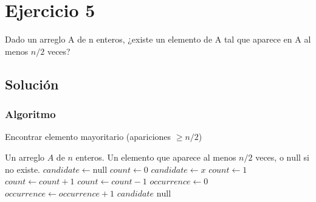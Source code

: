 \section{Ejercicio 5}
Dado un arreglo A de n enteros, ¿existe un elemento de A tal que aparece en A al menos $n/2$ veces?

\subsection*{Solución}
\subsubsection*{Algoritmo}
\begin{algorithm}[H]
\caption{Encontrar elemento mayoritario (apariciones $\geq n/2$)}
\begin{algorithmic}[1]
\REQUIRE Un arreglo \( A \) de \( n \) enteros.
\ENSURE Un elemento que aparece al menos \( n/2 \) veces, o \(\text{null}\) si no existe.
\STATE \( candidate \gets \text{null} \)
\STATE \( count \gets 0 \)
        \STATE \( candidate \gets x \)
        \STATE \( count \gets 1 \)
    \ELSE
            \STATE \( count \gets count + 1 \)
        \ELSE
            \STATE \( count \gets count - 1 \)
        \ENDIF
    \ENDIF
\ENDFOR
\STATE \( occurrence \gets 0 \)
         \STATE \( occurrence \gets occurrence + 1 \)
    \ENDIF
\ENDFOR
{}
    \RETURN \( candidate \)
\ELSE
    \RETURN \(\text{null}\) 
\ENDIF
\end{algorithmic}
\end{algorithm}

